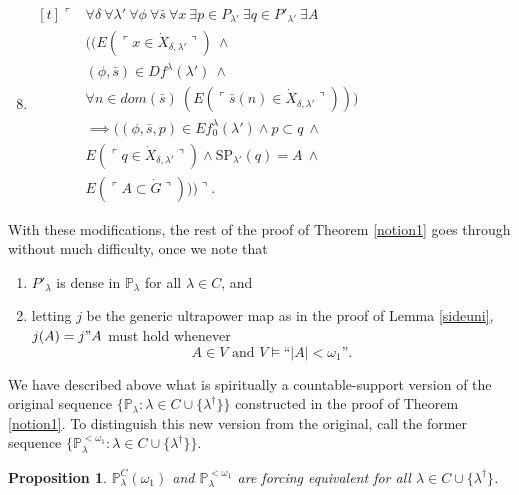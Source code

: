 \documentclass[12pt, twoside]{memoir}
\numberwithin{equation}{section}
\newtheorem{prop}[thm]{Proposition}
\theoremstyle{definition}
\theoremstyle{remark}
\theoremstyle{definition}
\theoremstyle{definition}
\theoremstyle{definition}
\theoremstyle{remark}
\begin{document}
\begin{enumerate}[label=(S\arabic*)$_{\lambda} \ :$, leftmargin=50pt]
    \setcounter{enumi}{7}
    \item\label{s8n}
    \!
    $\begin{aligned}[t]
        \ulcorner & \forall \delta \ \forall \lambda' \ \forall \phi \ \forall \bar{s} \ \forall x \ \exists p \in P_{\lambda'} \ \exists q \in P'_{\lambda'} \ \exists A \\
        & ((E(\ulcorner x \in \dot{X}_{\delta, \lambda'} \urcorner) \ \wedge \\
        & (\phi, \bar{s}) \in Df^{\lambda}(\lambda') \ \wedge \\
        & \forall n \in dom(\bar{s}) \ (E(\ulcorner \bar{s}(n) \in \dot{X}_{\delta, \lambda'} \urcorner))) \\
        & \implies ((\phi, \bar{s}, p) \in Ef_0^{\lambda}(\lambda') \wedge p \subset q \ \wedge \\
        & E(\ulcorner q \in \dot{X}_{\delta, \lambda'} \urcorner) \wedge \mathrm{SP}_{\lambda'}(q) = A \ \wedge \\
        & E(\ulcorner A \subset \dot{G} \urcorner))) \urcorner.
    \end{aligned}$
\end{enumerate}
With these modifications, the rest of the proof of Theorem \ref{notion1} goes through without much difficulty, once we note that
\begin{enumerate}[label=(CS\arabic*), leftmargin=40pt]
    \item\label{cs1} $P'_{\lambda}$ is dense in $\mathbb{P}_{\lambda}$ for all $\lambda \in C$, and
    \item\label{cs2} letting $j$ be the generic ultrapower map as in the proof of Lemma \ref{sideuni}, $j(A) = j" A$ must hold whenever $$A \in V \text{ and } V \models \text{``} |A| < \omega_1 \text{''.}$$
\end{enumerate}

We have described above what is spiritually a countable-support version of the original sequence $\{\mathbb{P}_{\lambda} : \lambda \in C \cup \{\lambda^{\dagger}\}\}$ constructed in the proof of Theorem \ref{notion1}. To distinguish this new version from the original, call the former sequence $\{\mathbb{P}^{< \omega_1}_{\lambda} : \lambda \in C \cup \{\lambda^{\dagger}\}\}$.

\begin{prop}\label{prop741}
$\mathbb{P}^C_{\lambda}(\omega_1)$ and $\mathbb{P}^{< \omega_1}_{\lambda}$ are forcing equivalent for all $\lambda \in C \cup \{\lambda^{\dagger}\}$.
\end{prop}
\end{document}

